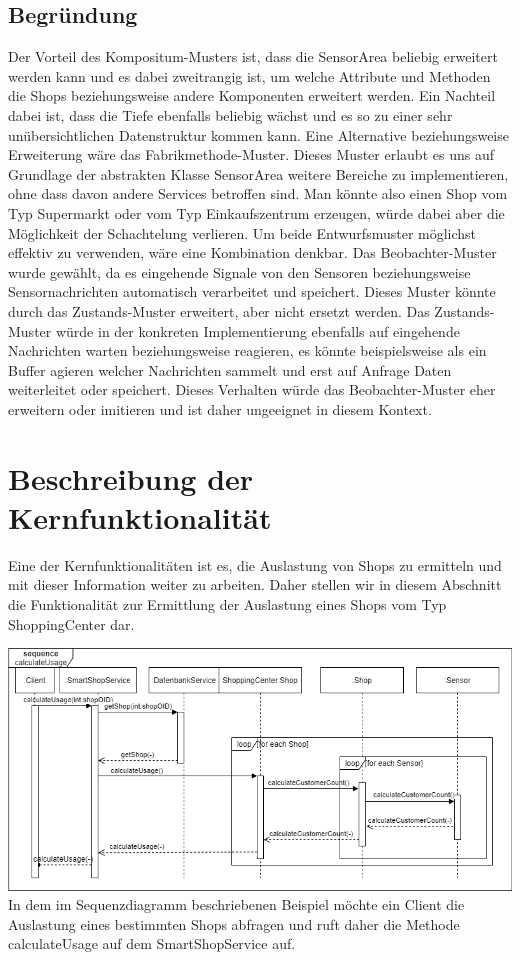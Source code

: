 \documentclass[runningheads]{llncs}
\begin{document}
\subsection{Begründung}
Der Vorteil des Kompositum-Musters ist, dass die SensorArea beliebig erweitert werden kann und es dabei zweitrangig ist, um welche Attribute und Methoden die Shops beziehungsweise andere Komponenten erweitert werden. 
Ein Nachteil dabei ist, dass die Tiefe ebenfalls beliebig wächst und es so zu einer sehr unübersichtlichen Datenstruktur kommen kann.
Eine Alternative beziehungsweise Erweiterung wäre das Fabrikmethode-Muster. 
Dieses Muster erlaubt es uns auf Grundlage der abstrakten Klasse SensorArea weitere Bereiche zu implementieren, ohne dass davon andere Services betroffen sind. 
Man könnte also einen Shop vom Typ Supermarkt oder vom Typ Einkaufszentrum erzeugen, würde dabei aber die Möglichkeit der Schachtelung verlieren. 
Um beide Entwurfsmuster möglichst effektiv zu verwenden, wäre eine Kombination denkbar.
Das Beobachter-Muster wurde gewählt, da es eingehende Signale von den Sensoren beziehungsweise Sensornachrichten automatisch verarbeitet und speichert.
Dieses Muster könnte durch das Zustands-Muster erweitert, aber nicht ersetzt werden.
Das Zustands-Muster würde in der konkreten Implementierung ebenfalls auf eingehende Nachrichten warten beziehungsweise reagieren, es könnte beispielsweise als ein Buffer agieren welcher Nachrichten sammelt und erst auf Anfrage Daten weiterleitet oder speichert.
Dieses Verhalten würde das Beobachter-Muster eher erweitern oder imitieren und ist daher ungeeignet in diesem Kontext.


\newpage
\section{Beschreibung der Kernfunktionalität}
Eine der Kernfunktionalitäten ist es, die Auslastung von Shops zu ermitteln und mit dieser Information weiter zu arbeiten.
Daher stellen wir in diesem Abschnitt die Funktionalität zur Ermittlung der Auslastung eines Shops vom Typ ShoppingCenter dar.

\includegraphics[width=\linewidth]{images/Sequenzdiagramm}
In dem im Sequenzdiagramm beschriebenen Beispiel möchte ein Client die Auslastung eines bestimmten Shops abfragen und ruft daher die Methode calculateUsage auf dem SmartShopService auf.
\\
\end{document}
